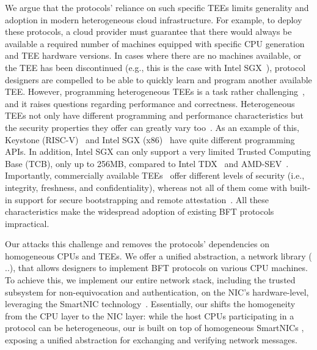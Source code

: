 We argue that the protocols' reliance on such specific TEEs limits generality and adoption in modern heterogeneous cloud infrastructure. For example, to deploy these protocols, a cloud provider must guarantee that there would always be available a required number of machines equipped with specific CPU generation and TEE hardware versions. In cases where there are no machines available, or the TEE has been discontinued (e.g., this is the case with Intel SGX~\cite{sgx_deprecated}), protocol designers are compelled to be able to quickly learn and program another available TEE. However, programming heterogeneous TEEs is a task rather challenging~\cite{10.1145/3460120.3485341}, and it raises questions regarding performance and correctness. Heterogeneous TEEs not only have different programming and performance characteristics but the security properties they offer can greatly vary too~\cite{10.1007/978-3-031-16092-9_7}. As an example of this, Keystone (RISC-V)~\cite{keystone_eurosys} and Intel SGX (x86)~\cite{intel-sgx} have quite different programming APIs. In addition, Intel SGX can only support a very limited Trusted Computing Base (TCB), only up to 256MB, compared to Intel TDX~\cite{intelTDX} and AMD-SEV~\cite{amd-sev}. 
Importantly, commercially available TEEs~\cite{arm-trustzone, intel-sgx, amd-sev, keystone_eurosys, 197162, timber} offer different levels of security (i.e., integrity, freshness, and confidentiality), whereas not all of them come with built-in support for secure bootstrapping and remote attestation~\cite{10.1007/978-3-031-16092-9_7, 7807249, secTEE}. All these characteristics make the widespread adoption of existing BFT protocols impractical.

 Our \projecttitle{} attacks this challenge and removes the protocols' dependencies on homogeneous CPUs and TEEs. We offer a unified abstraction, a network library ( ..), that allows designers to implement BFT protocols on various CPU machines. To achieve this, we implement our entire network stack, including the trusted subsystem for non-equivocation and authentication, on the NIC's hardware-level, leveraging the SmartNIC technology~\cite{}. Essentially, our \projecttitle{} shifts the homogeneity from the CPU layer to the NIC layer:  while the host CPUs participating in a protocol can be heterogeneous, our \projecttitle{} is built on top of homogeneous SmartNICs , exposing a unified abstraction for exchanging and verifying network messages.

